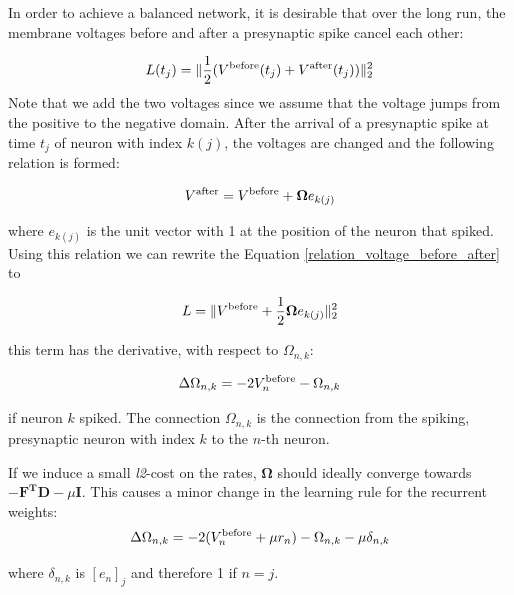 \documentclass[twoside,11pt]{article}
\begin{document}
In order to achieve a balanced network, it is desirable that over the long run, the
membrane voltages before and after a presynaptic spike cancel each other:

\begin{equation} \label{loss_voltage_before_after}
  L(t_j) = \| \frac{1}{2} (V^{\textnormal{before}}(t_j)+V^{\textnormal{after}}(t_j)) \| ^2_2
\end{equation}
Note that we add the two voltages since we assume that the voltage jumps from the positive to the
negative domain.
After the arrival of a presynaptic spike at time $t_j$ of neuron with index $k(j)$, the voltages are changed and the following relation is formed:

\begin{equation} \label{relation_voltage_before_after}
  V^{\textnormal{after}} = V^{\textnormal{before}} + \mathbf{\Omega} e_{k(j)}
\end{equation}

where $e_{k(j)}$ is the unit vector with 1 at the position of the neuron that spiked.
Using this relation we can rewrite the Equation \ref{relation_voltage_before_after} to

\begin{equation*} 
  L = \|V^{\textnormal{before}} + \frac{1}{2}\mathbf{\Omega} e_{k(j)}\|^2_2
\end{equation*}

this term has the derivative, with respect to $\Omega_{n,k}$:

\begin{equation*}
    \Delta \Omega_{n,k} = -2V^{\textnormal{before}}_n - \Omega_{n,k}
\end{equation*}

if neuron $k$ spiked. The connection $\Omega_{n,k}$ is the connection from the spiking, presynaptic neuron with index $k$ to the $n$-th neuron.

If we induce a small \textit{l2}-cost on the rates, $\mathbf{\Omega}$ should ideally converge towards $-\mathbf{F^TD} - \mu \mathbf{I}$. This causes a minor change in the learning rule for the recurrent weights:
\begin{equation*}
    \Delta \Omega_{n,k} = -2(V^{\textnormal{before}}_n + \mu r_n) - \Omega_{n,k} - \mu \delta_{n,k}
\end{equation*}

where $\delta_{n,k}$ is $[e_n]_j$ and therefore 1 if $n =j$.
\end{document}
